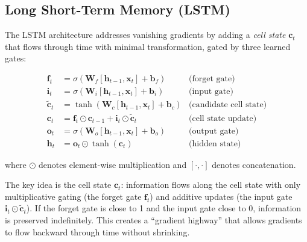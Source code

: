 \subsection{Long Short-Term Memory (LSTM)}

The LSTM architecture \citep{hochreiter1997} addresses vanishing gradients by adding a \emph{cell state} $\mathbf{c}_t$ that flows through time with minimal transformation, gated by three learned gates:

\begin{align}
\mathbf{f}_t &= \sigma(\mathbf{W}_f [\mathbf{h}_{t-1}, \mathbf{x}_t] + \mathbf{b}_f) & \text{(forget gate)} \\
\mathbf{i}_t &= \sigma(\mathbf{W}_i [\mathbf{h}_{t-1}, \mathbf{x}_t] + \mathbf{b}_i) & \text{(input gate)} \\
\tilde{\mathbf{c}}_t &= \tanh(\mathbf{W}_c [\mathbf{h}_{t-1}, \mathbf{x}_t] + \mathbf{b}_c) & \text{(candidate cell state)} \\
\mathbf{c}_t &= \mathbf{f}_t \odot \mathbf{c}_{t-1} + \mathbf{i}_t \odot \tilde{\mathbf{c}}_t & \text{(cell state update)} \\
\mathbf{o}_t &= \sigma(\mathbf{W}_o [\mathbf{h}_{t-1}, \mathbf{x}_t] + \mathbf{b}_o) & \text{(output gate)} \\
\mathbf{h}_t &= \mathbf{o}_t \odot \tanh(\mathbf{c}_t) & \text{(hidden state)}
\end{align}

where $\odot$ denotes element-wise multiplication and $[\cdot, \cdot]$ denotes concatenation.

The key idea is the cell state $\mathbf{c}_t$: information flows along the cell state with only multiplicative gating (the forget gate $\mathbf{f}_t$) and additive updates (the input gate $\mathbf{i}_t \odot \tilde{\mathbf{c}}_t$). If the forget gate is close to 1 and the input gate close to 0, information is preserved indefinitely. This creates a ``gradient highway'' that allows gradients to flow backward through time without shrinking.

